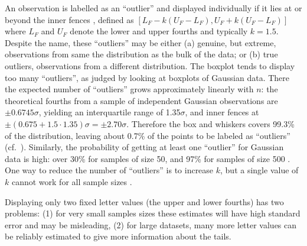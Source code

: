 \documentclass[oneside]{article}
\begin{document}
An observation is labelled as an ``outlier'' and displayed individually if it lies at or beyond the inner fences \citep{eda,emerson83}, defined as $[L_F - k(U_F - L_F), U_F + k(U_F - L_F)]$ where $L_F$ and $U_F$ denote the lower and upper fourths and typically $k = 1.5$. Despite the name, these ``outliers'' may be either (a) genuine, but extreme, observations from same the distribution as the bulk of the data; or (b) true outliers, observations from a different distribution. The boxplot tends to display too many ``outliers'', as judged by looking at boxplots of Gaussian data. There the expected number of ``outliers'' grows approximately linearly with $n$: the theoretical fourths from a sample of independent Gaussian observations are $\pm 0.6745\sigma$, yielding an interquartile range of 1.35$\sigma$, and inner fences at $\pm (0.675 + 1.5 \cdot 1.35)\sigma = \pm 2.70\sigma$. Therefore the box and whiskers covers 99.3\% of the distribution, leaving about 0.7\% of the points to be labeled as ``outliers'' (cf.~\citet{dchlv}). Similarly, the probability of getting at least one ``outlier'' for Gaussian data is high: over 30\% for samples of size 50, and 97\% for samples of size 500 \citep[pg. 1148]{dchbox}. One way to reduce the number of ``outliers'' is to increase $k$, but a single value of $k$ cannot work for all sample sizes \citep[pg. 1148]{dchbox}.

Displaying only two fixed letter values (the upper and lower fourths) has two problems: (1) for very small samples sizes these estimates will have high standard error and may be misleading, (2) for large datasets, many more letter values can be reliably estimated to give more information about the tails. 

\end{document}
